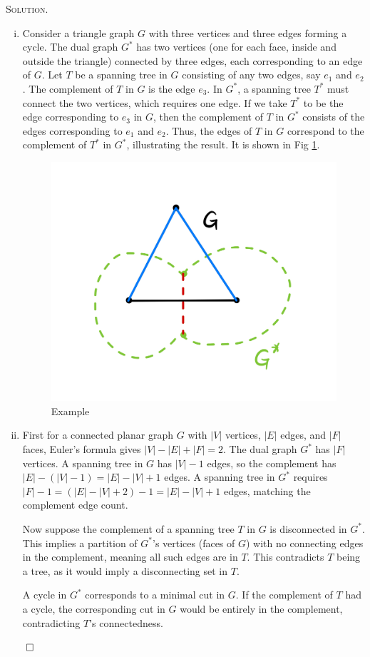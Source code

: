 \documentclass[12pt, a4paper, oneside]{ctexart}
\newenvironment{solution}{%
	\par\noindent\textsc{Solution. }\ignorespaces
}{%
	\hfill$\qed$\par
}
\begin{document}
	\begin{solution}
       
		\begin{enumerate}[(i)]
			\item Consider a triangle graph $G$ with three vertices and three edges 
			forming a cycle. The dual graph $G^*$ has two vertices 
			(one for each face, inside and outside the triangle) connected by three 
			edges, each corresponding to an edge of $G$. Let $T$ be a spanning tree 
			in $G$ consisting of any two edges, say $e_1$ and $e_2$. 
			The complement of $T$ in $G$ is the edge $e_3$. In $G^*$, 
			a spanning tree $T^*$ must connect the two vertices, 
			which requires one edge. If we take $T^*$ to be the edge corresponding 
			to $e_3$ in $G$, then the complement of $T$ in $G^*$ consists of the edges 
			corresponding to $e_1$ and $e_2$. Thus, the edges of $T$ in $G$ correspond 
			to the complement of $T^*$ in $G^*$, illustrating the result. It is shown in Fig \ref{fig:ex2}.
			\begin{figure}[H]
				\small
				\centering
				\includegraphics[width=0.5\columnwidth]{figure/fig2.jpg}
				\caption{Example}
				\label{fig:ex2}
			\end{figure}

			\item 
				First for a connected planar graph $G$ with $|V|$ vertices, $|E|$ edges, 
				and $|F|$ faces, Euler's formula gives $|V| - |E| + |F| = 2$. 
				The dual graph $G^*$ has $|F|$ vertices. A spanning tree in $G$ has $|V| - 1$ 
				edges, so the complement has $|E| - (|V| - 1) = |E| - |V| + 1$ edges. 
				A spanning tree in $G^*$ requires $|F| - 1 = (|E| - |V| + 2) - 1 = |E| - |V| + 1$ 
				edges, matching the complement edge count.
			
				Now suppose the complement of a spanning tree $T$ in $G$ is disconnected in $G^*$. 
				This implies a partition of $G^*$'s vertices (faces of $G$) with no connecting edges in the complement, meaning all such edges are in $T$. This contradicts $T$ being a tree, as it would imply a disconnecting set in $T$.
			
				A cycle in $G^*$ corresponds to a minimal cut in $G$. If the complement of $T$ had a cycle, the corresponding cut in $G$ would be entirely in the complement, contradicting $T$'s connectedness.
			
		\end{enumerate}


    \end{solution}
		
\end{document}

